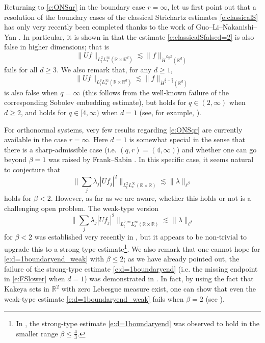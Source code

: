 \documentclass[a4paper]{amsart}
\numberwithin{equation}{section}%
\theoremstyle{plain}%
\theoremstyle{definition}
\theoremstyle{remark}%
\begin{document}
Returning to \eqref{e:ONSqr} in the boundary case $r = \infty$, let us first point out that a  resolution of the boundary cases of the classical Strichartz estimates \eqref{e:classicalS} has only very recently been completed thanks to the work of Guo--Li--Nakanishi--Yan \cite{GLNY}. In particular, it is shown in \cite{GLNY} that the estimate \eqref{e:classicalSfalsed=2} is also false in higher dimensions; that is
\begin{equation} \label{e:classicalSfalse}
\| Uf \|_{L^2_tL^\infty_x(\mathbb{R} \times \mathbb{R}^d)} \lesssim \|f\|_{\dot{H}^{\frac{d-2}{2}}(\mathbb{R}^d)}
\end{equation}
fails for all $d \geq 3$. We also remark that, for any $d \geq 1$,
\begin{equation} \label{e:classicalSfalse_allq}
\| Uf \|_{L^q_tL^\infty_x(\mathbb{R} \times \mathbb{R}^d)} \lesssim \|f\|_{\dot{H}^{\frac{d}{2}-\frac{2}{q}}(\mathbb{R}^d)}
\end{equation}
is also false when $q = \infty$ (this follows from the well-known failure of the corresponding Sobolev embedding estimate), but holds for $q \in (2,\infty)$ when $d \geq 2$, and holds for $q \in [4,\infty)$ when $d = 1$ (see, for example, \cite[Section 2]{GLNY}).

For orthonormal systems, very few results regarding \eqref{e:ONSqr} are currently available in the case $r = \infty$. Here $d = 1$ is somewhat special in the sense that there is a sharp-admissible case (i.e. $(q,r) = (4,\infty)$) and whether one can go beyond $\beta = 1$ was raised by Frank--Sabin \cite{FS_Survey}. In this specific case, it seems natural to conjecture that
\begin{equation} \label{e:d=1boundaryend}
\bigg\| \sum_j \lambda_j |Uf_j|^2 \bigg\|_{L^{2}_tL^\infty_x(\mathbb{R} \times \mathbb{R})} \lesssim \| \lambda \|_{\ell^\beta}
\end{equation}
holds for $\beta < 2$. However, as far as we are aware, whether this holds or not is a challenging open problem. The weak-type version
\begin{equation}\label{e:d=1boundaryend_weak}
\bigg\| \sum_j \lambda_j |Uf_j|^2 \bigg\|_{L^{2,\infty}_tL^\infty_x(\mathbb{R} \times \mathbb{R})} \lesssim \| \lambda \|_{\ell^\beta}
\end{equation}
for $\beta < 2$ was established very recently in \cite{BLN_Selecta}, but it appears to be non-trivial to upgrade this to a strong-type estimate\footnote{In \cite{BLN_Selecta}, the strong-type estimate \eqref{e:d=1boundaryend} was observed to hold in the smaller range $\beta \leq \frac{4}{3}$.}. We also remark that one cannot hope for \eqref{e:d=1boundaryend_weak} with $\beta \leq 2$; as we have already pointed out, the failure of the strong-type estimate \eqref{e:d=1boundaryend} (i.e. the missing endpoint in \eqref{e:FSlower} when $d = 1$) was demonstrated in \cite{FLLS}. In fact, by using the fact that Kakeya sets in $\mathbb{R}^2$ with zero Lebesgue measure exist, one can show that even the weak-type estimate \eqref{e:d=1boundaryend_weak} fails when $\beta = 2$ (see \cite{BHLNS}).
\end{document}
